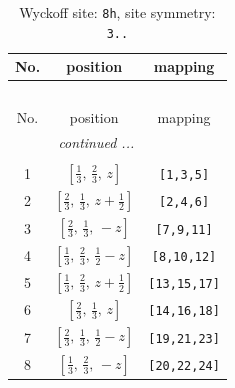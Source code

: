 \documentclass[fleqn,8pt]{jsarticle}
\begin{document}
\begin{longtable}{ccc}
\caption{Wyckoff site: {\tt 8h}, site symmetry: {\tt 3..}}
 \\
 \hline \hline
No. & position & mapping \\ \hline \endfirsthead

\multicolumn{2}{l}{\tablename\ \thetable{}} \\
 \hline \hline
No. & position & mapping \\ \hline \endhead

 \hline \hline
\multicolumn{2}{r}{\footnotesize\it continued ...} \\ \endfoot

 \hline \hline
\multicolumn{2}{r}{} \\ \endlastfoot

1 & $\left[ \frac{1}{3},\, \frac{2}{3},\, z \right]$ & {\tt [1,3,5]} \\ \hline
2 & $\left[ \frac{2}{3},\, \frac{1}{3},\, z + \frac{1}{2} \right]$ & {\tt [2,4,6]} \\ \hline
3 & $\left[ \frac{2}{3},\, \frac{1}{3},\, - z \right]$ & {\tt [7,9,11]} \\ \hline
4 & $\left[ \frac{1}{3},\, \frac{2}{3},\, \frac{1}{2} - z \right]$ & {\tt [8,10,12]} \\ \hline
5 & $\left[ \frac{1}{3},\, \frac{2}{3},\, z + \frac{1}{2} \right]$ & {\tt [13,15,17]} \\ \hline
6 & $\left[ \frac{2}{3},\, \frac{1}{3},\, z \right]$ & {\tt [14,16,18]} \\ \hline
7 & $\left[ \frac{2}{3},\, \frac{1}{3},\, \frac{1}{2} - z \right]$ & {\tt [19,21,23]} \\ \hline
8 & $\left[ \frac{1}{3},\, \frac{2}{3},\, - z \right]$ & {\tt [20,22,24]} \\
\end{longtable}
\renewcommand{\arraystretch}{1.2}
\end{document}
